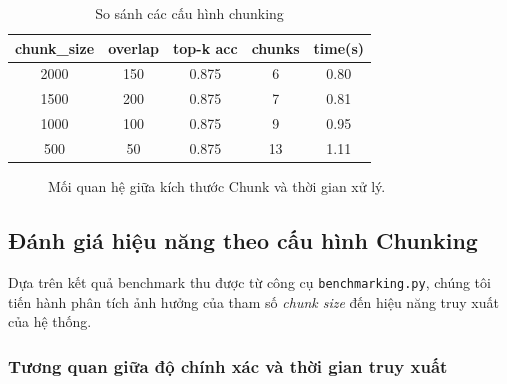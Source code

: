 ﻿\documentclass[10pt, conference, a4paper, compsocconf]{IEEEtran}
\begin{document}
\vspace{-0.2cm}
\begin{table}[H]
\renewcommand{\arraystretch}{1.2}
\caption{So sánh các cấu hình chunking}
\label{tab:chunking-benchmark}
\centering
\begin{tabular}{|c|c|c|c|c|}
\hline
\textbf{chunk\_size} & \textbf{overlap} & \textbf{top-k acc} & \textbf{chunks} & \textbf{time(s)} \\ \hline
2000 & 150 & 0.875 & 6 & 0.80 \\ \hline
1500 & 200 & 0.875 & 7 & 0.81 \\ \hline
1000 & 100 & 0.875 & 9 & 0.95 \\ \hline
500  & 50  & 0.875 & 13 & 1.11 \\ \hline
\end{tabular}
\end{table}

\vspace{-0.4cm} 
\begin{figure}[H]
\centering
{}
\vspace{-0.2cm} 
\caption{Mối quan hệ giữa kích thước Chunk và thời gian xử lý.}
\label{fig:chunk-time}
\end{figure}
\vspace{-0.3cm} 

\subsection{Đánh giá hiệu năng theo cấu hình Chunking}

Dựa trên kết quả benchmark thu được từ công cụ \texttt{benchmarking.py}, chúng tôi tiến hành phân tích ảnh hưởng của tham số \textit{chunk size} đến hiệu năng truy xuất của hệ thống.

\subsubsection{Tương quan giữa độ chính xác và thời gian truy xuất}
\end{document}
